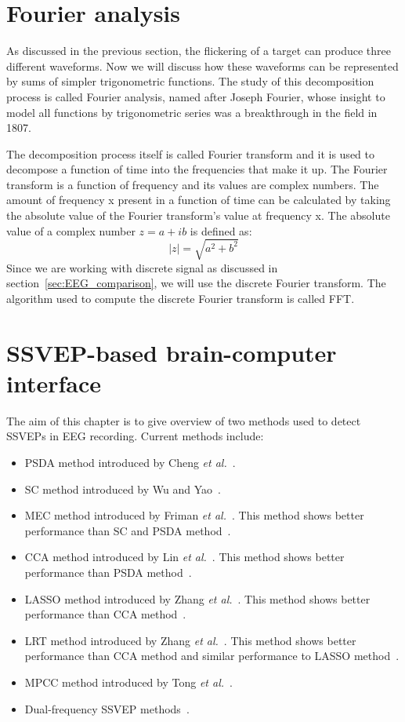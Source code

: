 \section{Fourier analysis}
\label{sec:fourier}

As discussed in the previous section, the flickering of a target can produce three different waveforms. Now we will discuss how these waveforms can be represented by sums of simpler trigonometric functions. The study of this decomposition process is called Fourier analysis, named after Joseph Fourier, whose insight to model all functions by trigonometric series was a breakthrough in the field in 1807.

The decomposition process itself is called Fourier transform and it is used to decompose a function of time into the frequencies that make it up. The Fourier transform is a function of frequency and its values are complex numbers. The amount of frequency x present in a function of time can be calculated by taking the absolute value of the Fourier transform's value at frequency x. The absolute value of a complex number $z=a+ib$ is defined as:
\begin{equation}
	|z|=\sqrt{a^2+b^2}
\end{equation}
Since we are working with discrete signal as discussed in section~\ref{sec:EEG_comparison}, we will use the discrete Fourier transform. The algorithm used to compute the discrete Fourier transform is called \gls{FFT}.

\section{SSVEP-based brain-computer interface}
\label{sec:SSVEP_detection}
The aim of this chapter is to give overview of two methods used to detect \glspl{SSVEP} in \gls{EEG} recording. Current methods include:
\begin{itemize}
	\item \Gls{PSDA} method introduced by Cheng \emph{et al.}~\cite{psda}.
	\item \Gls{SC} method introduced by Wu and Yao~\cite{sc}.
	\item \Gls{MEC} method introduced by Friman \emph{et al.}~\cite{mec}. This method shows better performance than \gls{SC} and \gls{PSDA} method~\cite{mec_comparison}.
	\item \Gls{CCA} method introduced by Lin \emph{et al.}~\cite{cca_lin}. This method shows better performance than \gls{PSDA} method~\cite{bin2009cca}.
	\item \Gls{LASSO} method introduced by Zhang \emph{et al.}~\cite{LASSO}. This method shows better performance than \gls{CCA} method~\cite{LASSO}.
	\item \Gls{LRT} method introduced by Zhang \emph{et al.}~\cite{LRT}. This method shows better performance than \gls{CCA} method and similar performance to \gls{LASSO} method~\cite{LRT}.
	\item \Gls{MPCC} method introduced by Tong \emph{et al.}~\cite{MPCC}.
	\item Dual-frequency \gls{SSVEP} methods~\cite{dual1, dual2}.
\end{itemize}

